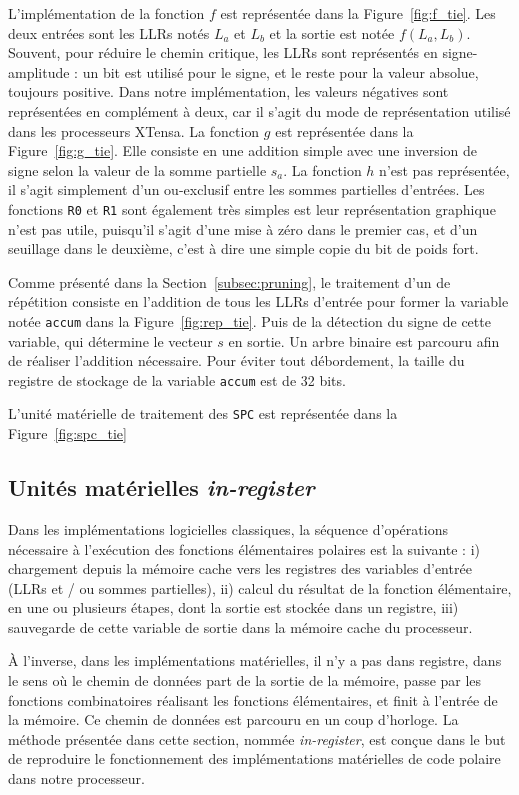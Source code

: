 L'implémentation de la fonction $f$ est représentée dans la Figure~\ref{fig:f_tie}. Les deux entrées sont les LLRs notés $L_a$ et $L_b$ et la sortie est notée $f(L_a,L_b)$. Souvent, pour réduire le chemin critique, les LLRs sont représentés en \og signe-amplitude \fg : un bit est utilisé pour le signe, et le reste pour la valeur absolue, toujours positive. Dans notre implémentation, les valeurs négatives sont représentées en complément à deux, car il s'agit du mode de représentation utilisé dans les processeurs XTensa.
La fonction $g$ est représentée dans la Figure~\ref{fig:g_tie}. Elle consiste en une addition simple avec une inversion de signe selon la valeur de la somme partielle $s_a$.
La fonction $h$ n'est pas représentée, il s'agit simplement d'un ou-exclusif entre les sommes partielles d'entrées. Les fonctions \texttt{R0} et \texttt{R1} sont également très simples est leur représentation graphique n'est pas utile, puisqu'il s'agit d'une mise à zéro dans le premier cas, et d'un seuillage dans le deuxième, c'est à dire une simple copie du bit de poids fort.

Comme présenté dans la Section~\ref{subsec:pruning}, le traitement d'un \noeud de répétition consiste en l'addition de tous les LLRs d'entrée pour former la variable notée \og \texttt{accum} \fg dans la Figure~\ref{fig:rep_tie}. Puis de la détection du signe de cette variable, qui détermine le vecteur $s$ en sortie. Un arbre binaire est parcouru afin de réaliser l'addition nécessaire. Pour éviter tout débordement, la taille du registre de stockage de la variable \texttt{accum} est de 32 bits.

L'unité matérielle de traitement des \noeuds \texttt{SPC} est représentée dans la Figure~\ref{fig:spc_tie}

\subsection{Unités matérielles \textit{in-register}}

Dans les implémentations logicielles classiques, la séquence d'opérations nécessaire à l'exécution des fonctions élémentaires polaires est la suivante : i) chargement depuis la mémoire cache vers les registres des variables d'entrée (LLRs et / ou sommes partielles), ii) calcul du résultat de la fonction élémentaire, en une ou plusieurs étapes, dont la sortie est stockée dans un registre, iii) sauvegarde de cette variable de sortie dans la mémoire cache du processeur.

\`A l'inverse, dans les implémentations matérielles, il n'y a pas dans registre, dans le sens où le chemin de données part de la sortie de la mémoire, passe par les fonctions combinatoires réalisant les fonctions élémentaires, et finit à l'entrée de la mémoire. Ce chemin de données est parcouru en un coup d'horloge. La méthode présentée dans cette section, nommée \textit{in-register}, est conçue dans le but de reproduire le fonctionnement des implémentations matérielles de code polaire dans notre processeur.

